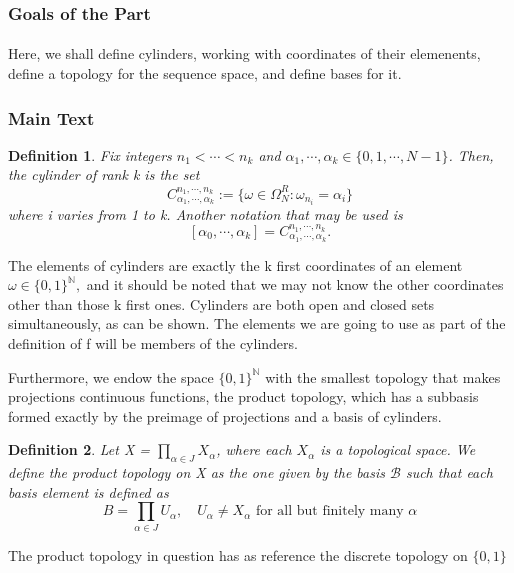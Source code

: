 \documentclass{article}
\newtheorem*{def*}{Definition}
\begin{document}
 \subsubsection{Goals of the Part}
 \paragraph{} Here, we shall define cylinders, working with coordinates of their elemenents, define a topology for the sequence space, and define
bases for it.
\subsubsection{Main Text}
 \begin{def*}
  Fix integers $n _{1} < \cdots < n _{k}$ and $\alpha _{1}, \cdots, \alpha _{k}\in \{0, 1, \cdots, N-1\} $. Then, the cylinder of rank k is the set
  $$
  C _{\alpha _{1}, \cdots, \alpha _{k}}^{n _{1}, \cdots, n _{k}}:= \{\omega\in \Omega _{N}^{R}: \omega _{n_i} = \alpha _{i}\}
  $$
where i varies from 1 to k. Another notation that may be used is 
  $$
    [\alpha_{0}, \cdots, \alpha_{k}] = C_{\alpha_{1},\cdots,\alpha_{k}}^{n_{1},\cdots,n_{k}}.
  $$
 \end{def*}
 The elements of cylinders are exactly the k first coordinates of an element $\omega\in \{0, 1\}^{\mathbb{N}},$ and it should
be noted that we may not know the other coordinates other than those k first ones. Cylinders are both open and closed 
sets simultaneously, as can be shown. The elements we are going to use as part of the definition of f will be members of
the cylinders.
  
  Furthermore, we endow the space $\{0, 1\}^{\mathbb{N}}$ with the smallest topology that makes projections continuous functions, the product topology,
which has a subbasis formed exactly by the preimage of projections and a basis of cylinders. 
\begin{def*}
  Let X = $\prod\limits _{\alpha\in{J}} X _{\alpha}$, where each $X _{\alpha}$ is a topological space. We define the product
topology on X as the one given by the basis $\mathcal{B}$ such that each basis element is defined as
  $$
  B = \prod _{\alpha\in{J}} U _{\alpha}, \quad U _{\alpha}\neq{X _{\alpha}} \text{ for all but finitely many }\alpha
  $$
\end{def*}
  The product topology in question has as reference the discrete topology on $\{0, 1\}$
 
\end{document}
